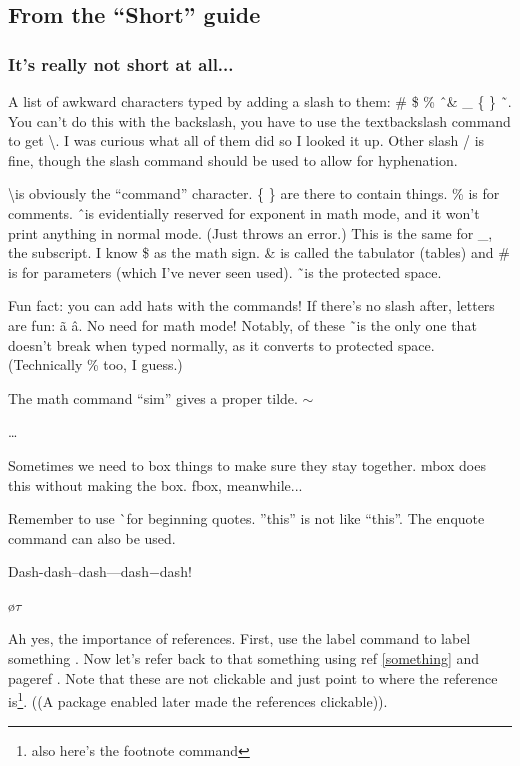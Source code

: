 \documentclass{article}
\begin{document}
\subsection{From the ``Short'' guide}
\subsubsection{It's really not short at all...}

A list of awkward characters typed by adding a slash to them: \# \$ \% \^\ \& \_ \{ \} \~\ . You can't do this with the backslash, you have to use the textbackslash command to get \textbackslash. I was curious what all of them did so I looked it up. Other slash / is fine, though the slash command should be used to allow for hyphenation.

\textbackslash is obviously the ``command'' character. \{ \} are there to contain things. \% is for comments. \^\ is evidentially reserved for exponent in math mode, and it won't print anything in normal mode. (Just throws an error.) This is the same for \_, the subscript. I know \$ as the math sign. \& is called the tabulator (tables) and \# is for parameters (which I've never seen used). \~\ is the protected space. 

Fun fact: you can add hats with the commands! If there's no slash after, letters are fun: \~a \^a. No need for math mode! Notably, of these \~\ is the only one that doesn't break when typed normally, as it converts to protected space. (Technically \% too, I guess.) 

The math command ``sim'' gives a proper tilde. $\sim$

\ldots

Sometimes we need to box things to make sure they stay together. mbox does this without making the box. fbox, meanwhile... 

Remember to use \`\ for beginning quotes. ''this'' is not like ``this''. The enquote command can also be used.

Dash-dash--dash---dash$-$dash!

\o $\tau$

Ah yes, the importance of references. First, use the label command to label something \label{something}. Now let's refer back to that something using ref \ref{something} and pageref \pageref{something}. Note that these are not clickable and just point to where the reference is\footnote{also here's the footnote command}. ((A package enabled later made the references clickable)). 
\end{document}

